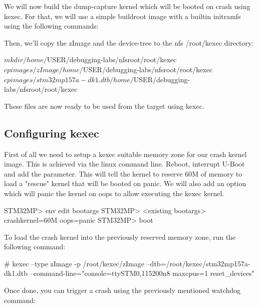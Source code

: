 We will now build the dump-capture kernel which will be booted on crash using
kexec. For that, we will use a simple buildroot image with a builtin initramfs
using the following commands:


Then, we'll copy the zImage and the device-tree to the nfs /root/kexec
directory:

\begin{bashinput}
$ mkdir /home/$USER/debugging-labs/nfsroot/root/kexec
$ cp images/zImage /home/$USER/debugging-labs/nfsroot/root/kexec
$ cp images/stm32mp157a-dk1.dtb /home/$USER/debugging-labs/nfsroot/root/kexec
\end{bashinput}

These files are now ready to be used from the target using kexec.

\subsection{Configuring kexec}

First of all we need to setup a kexec suitable memory zone for our crash kernel
image. This is achieved via the linux command line. Reboot, interrupt U-Boot and
add the  parameter. This will tell the kernel to reserve
60M of memory to load a "rescue" kernel that will be booted on panic. We will
also add an option which will panic the kernel on oops to allow executing the
kexec kernel.

\begin{bashinput}
STM32MP> env edit bootargs
STM32MP> <existing bootargs> crashkernel=60M oops=panic
STM32MP> boot
\end{bashinput}

To load the crash kernel into the previously reserved memory zone, run the
following command:

\begin{bashinput}
# kexec --type zImage -p /root/kexec/zImage --dtb=/root/kexec/stm32mp157a-dk1.dtb
  --command-line="console=ttySTM0,115200n8 maxcpus=1 reset_devices"
\end{bashinput}

Once done, you can trigger a crash using the previously mentioned watchdog
command:

